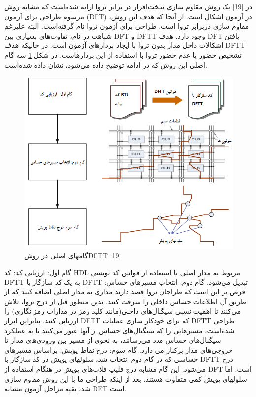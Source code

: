 در [19] یک روش مقاوم سازی سخت‌افزار در برابر تروا ارائه شده‌است که مشابه روش مرسوم طراحی برای آزمون (DFT) در آزمون اشکال است. از آنجا که هدف این روش، مقاوم سازی دربرابر تروا است، طراحی برای آزمون تروا نام گرفته‌است. البته علیرغم شباهت در نام، تفاوت‌های بسیاری بین DFT و DFTT وجود دارد. هدف DFT یافتن اشکالات داخل مدار بدون تروا با ایجاد بردارهای آزمون است. در حالیکه هدف DFTT تشخیص حضور یا عدم حضور تروا با استفاده از این بردارهاست. در شکل \ref{fig7-5} سه گام اصلی این روش که در ادامه توضیح داده می‌شود، نشان داده شده‌است.
 \begin{figure}
\begin{center}
\includegraphics[scale=1]{figs/fig7-5.png}
\caption{گامهای اصلی در روشDFTT [19]}
\label{fig7-5}
\end{center}
\end{figure} 

گام اول: ارزیابی کد:
کد HDL مربوط به مدار اصلی با استفاده از قوانین کد نویسی DFTT به یک کد سازگار با DFTT تبدیل می‌شود.
گام دوم: انتخاب مسیرهای حساس:
فرض بر این است که طراحان تروا قصد دارند مداری به مدار اصلی اضافه کنند که از طریق آن اطلاعات حساس داخلی را سرقت کنند. بدین منظور قبل از درج تروا، تلاش می‌کنند تا اهمیت نسبی سیگنال‌های داخلی(مانند کلید رمز در مدارات رمز نگاری) را ارزیابی کنند. بنابراین ابزار DFTT که برای خودکار سازی عملیات DFTT طراحی شده‌است، مسیرهایی را که سیگنال‌های حساس از آنها عبور می‌کنند یا به عملکرد سیگنال‌های حساس مدد می‌رسانند، به نحوی از مسیر بین ورودی‌های مدار تا خروجی‌های مدار برکنار می دارد.
گام سوم: درج نقاط پویش:
براساس مسیرهای حساسی که در گام دوم انتخاب شد، سلولهای پویش در کد سازگار با DFTT درج می‌شود. این گام مشابه درج فلیپ فلاپ‌های پویش در هنگام استفاده از DFT است. اما سلولهای پویش کمی متفاوت هستند. 
بعد از اینکه طراحی ما با این روش مقاوم سازی شد، بقیه مراحل آزمون مشابه DFT است.

